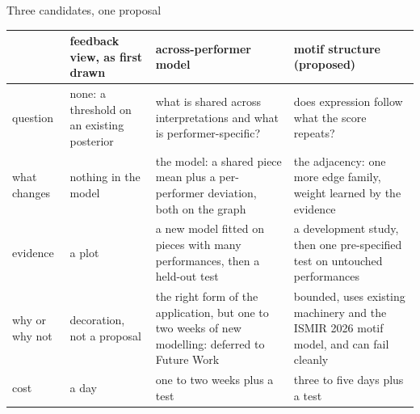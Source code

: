 \documentclass[aspectratio=169,11pt]{beamer}
\begin{document}
\begin{frame}{Three candidates, one proposal}
  \footnotesize
  \begin{tabular}{@{}p{2.0cm}p{3.5cm}p{3.6cm}p{3.8cm}@{}}
    \toprule
     & \textbf{feedback view, as first drawn} & \textbf{across-performer model} & \textbf{motif structure (proposed)} \\
    \midrule
    question & none: a threshold on an existing posterior & what is shared across interpretations and what is performer-specific? & does expression follow what the score repeats? \\[1mm]
    what changes & nothing in the model & the model: a shared piece mean plus a per-performer deviation, both on the graph & the adjacency: one more edge family, weight learned by the evidence \\[1mm]
    evidence & a plot & a new model fitted on pieces with many performances, then a held-out test & a development study, then one pre-specified test on untouched performances \\[1mm]
    why or why not & decoration, not a proposal & the right form of the application, but one to two weeks of new modelling: deferred to Future Work & bounded, uses existing machinery and the ISMIR 2026 motif model, and can fail cleanly \\[1mm]
    cost & a day & one to two weeks plus a test & three to five days plus a test \\
    \bottomrule
  \end{tabular}
\end{frame}
\end{document}
